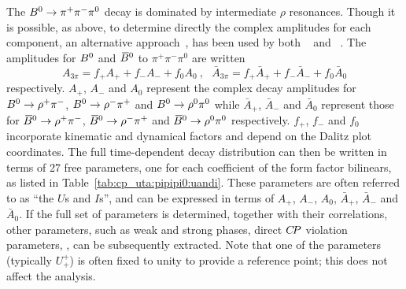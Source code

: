 The $B^0 \to \pi^+\pi^-\pi^0$ decay is dominated by 
intermediate $\rho$ resonances.
Though it is possible, as above, 
to determine directly the complex amplitudes for each component,
an alternative approach~\cite{Snyder:1993mx,Quinn:2000by},
has been used by both \babar~\cite{Aubert:2007jn}
and \belle~\cite{Kusaka:2007dv,:2007mj}.
The amplitudes for $B^0$ and $\kern 0.18em\overline{\kern -0.18em B}{}^0$ to $\pi^+\pi^-\pi^0$ are written
\begin{equation}
  A_{3\pi} = f_+ A_+ + f_- A_- + f_0 A_0
  \ , \ \ \ 
  \bar{A}_{3\pi} = f_+ \bar{A}_+ + f_- \bar{A}_- + f_0 \bar{A}_0
\end{equation}
respectively.
$A_+$, $A_-$ and $A_0$
represent the complex decay amplitudes for 
$B^0 \to \rho^+\pi^-$, $B^0 \to \rho^-\pi^+$ and $B^0 \to \rho^0\pi^0$
while 
$\bar{A}_+$, $\bar{A}_-$ and $\bar{A}_0$
represent those for 
$\kern 0.18em\overline{\kern -0.18em B}{}^0 \to \rho^+\pi^-$, $\kern 0.18em\overline{\kern -0.18em B}{}^0 \to \rho^-\pi^+$ and $\kern 0.18em\overline{\kern -0.18em B}{}^0 \to \rho^0\pi^0$
respectively.
$f_+$, $f_-$ and $f_0$ incorporate kinematic and dynamical factors
and depend on the Dalitz plot coordinates.
The full time-dependent decay distribution can then be written 
in terms of 27 free parameters,
one for each coefficient of the form factor bilinears,
as listed in Table~\ref{tab:cp_uta:pipipi0:uandi}.
These parameters are often referred to as ``the $U$s and $I$s'',
and can be expressed in terms of 
$A_+$, $A_-$, $A_0$, $\bar{A}_+$, $\bar{A}_-$ and $\bar{A}_0$.
If the full set of parameters is determined,
together with their correlations,
other parameters, such as weak and strong phases,
direct $C\!P$ violation parameters, \etc, 
can be subsequently extracted.
Note that one of the parameters (typically $U_+^+$)
is often fixed to unity to provide a reference point;
this does not affect the analysis.


